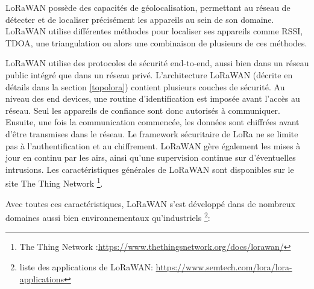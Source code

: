 \vspace{0.1cm}

LoRaWAN possède des capacités de géolocalisation, permettant au réseau de détecter et de localiser précisément les appareils au sein de son domaine. LoRaWAN utilise différentes méthodes pour localiser ses appareils comme \ac{RSSI}, \ac{TDOA}, une triangulation ou alors une combinaison de plusieurs de ces méthodes.

\vspace{0.1cm}

LoRaWAN utilise des protocoles de sécurité end-to-end, aussi bien dans un réseau public intégré que dans un réseau privé. L'architecture LoRaWAN (décrite en détails dans la section \ref{topolora}) contient plusieurs couches de sécurité. Au niveau des end devices, une routine d'identification est imposée avant l'accès au réseau. Seul les appareils de confiance sont donc autorisés à communiquer. Ensuite, une fois la communication commencée, les données sont chiffrées avant d'être transmises dans le réseau. Le framework sécuritaire de \ac{LoRa} ne se limite pas à l'authentification et au chiffrement. LoRaWAN gère également les mises à jour en continu par les airs, ainsi qu'une supervision continue sur d'éventuelles intrusions. Les caractéristiques générales de LoRaWAN sont disponibles sur le site The Thing Network \footnote{The Thing Network :\href{https://www.thethingsnetwork.org/docs/lorawan/}{https://www.thethingsnetwork.org/docs/lorawan/}}.

\vspace{0.1cm}

Avec toutes ces caractéristiques, LoRaWAN s'est développé dans de nombreux domaines aussi bien environnementaux qu'industriels \footnote{liste des applications de LoRaWAN: \href{https://www.semtech.com/lora/lora-applications}{https://www.semtech.com/lora/lora-applications}}:

\vspace{0.1cm}

